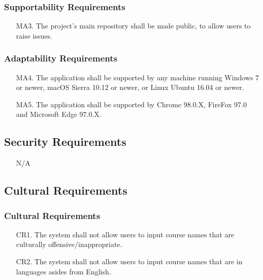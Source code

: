 \documentclass[12pt, titlepage]{article}
\begin{document}
\subsubsection{Supportability Requirements}

\begin{itemize}
  \item[MA3.] The project’s main repository shall be made public, to allow users to raise issues. 
\end{itemize}

\subsubsection{Adaptability Requirements}

\begin{itemize}
  \item[MA4.] The application shall be supported by any machine running Windows 7 or newer, macOS Sierra 10.12 or newer, or Linux Ubuntu 16.04 or newer.
  \item[MA5.] The application shall be supported by Chrome 98.0.X, FireFox 97.0 and Microsoft Edge 97.0.X. 
\end{itemize}

\subsection{Security Requirements}

\begin{itemize}
  \item[] N/A
\end{itemize}

\subsection{Cultural Requirements}

\subsubsection{Cultural Requirements}

\begin{itemize}
  \item[CR1.] The system shall not allow users to input course names that are culturally offensive/inappropriate. 
  \item[CR2.] The system shall not allow users to input course names that are in languages asides from English. 
\end{itemize}
\end{document}
